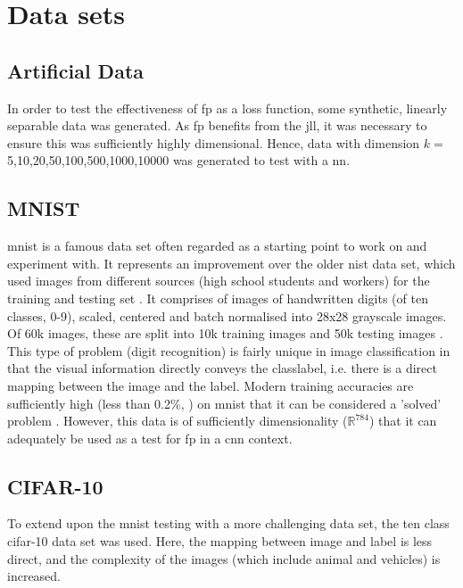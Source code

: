 \section{Data sets}
 
\subsection{Artificial Data}

In order to test the effectiveness of \gls{fp} as a loss function, some synthetic, linearly separable data was generated. As  \gls{fp} benefits from the  \gls{jll}, it was necessary to ensure this was sufficiently highly dimensional. Hence, data with dimension $k =$ 5,10,20,50,100,500,1000,10000 was generated to test with a  \gls{nn}. 
\bigskip

 \subsection{MNIST}
 
\gls{mnist} is a famous data set often regarded as a starting point to work on and experiment with. It represents an improvement over the older \gls{nist} data set, which used images from different sources (high school students and workers) for the training and testing set \cite{nist}. It comprises of images of handwritten digits (of ten classes, 0-9), scaled, centered and batch normalised into 28x28 grayscale images. Of 60k images, these are split into 10k training images and 50k testing images \cite{mnist}. This type of problem (digit recognition) is fairly unique in image classification in that the visual information directly conveys the \gls{classlabel}, i.e. there is a direct mapping between the image and the label. Modern training accuracies are sufficiently high (less than 0.2\%, \cite{mnist_sota}) on \gls{mnist} that it can be considered a 'solved' problem \cite{mnist_sota_web}. However, this data is of sufficiently dimensionality ($\mathds{R}^{784}$) that it can adequately be used as a test for \gls{fp} in a \gls{cnn} context. 
 \bigskip

\subsection{CIFAR-10}

To extend upon the \gls{mnist} testing with a more challenging data set, the ten class \gls{cifar}-10 data set was used. Here, the mapping between image and label is less direct, and the complexity of the images (which include animal and vehicles) is increased.
\bigskip

